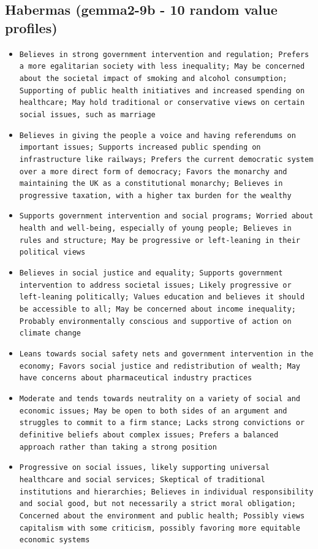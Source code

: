\documentclass[11pt]{article}
\begin{document}
\subsection{Habermas (gemma2-9b - 10 random value profiles)}
\begin{itemize}
\item \texttt{Believes in strong government intervention and regulation; Prefers a more egalitarian society with less inequality; May be concerned about the societal impact of smoking and alcohol consumption; Supporting of public health initiatives and increased spending on healthcare; May hold traditional or conservative views on certain social issues, such as marriage}
\item \texttt{Believes in giving the people a voice and having referendums on important issues; Supports increased public spending on infrastructure like railways; Prefers the current democratic system over a more direct form of democracy; Favors the monarchy and maintaining the UK as a constitutional monarchy; Believes in progressive taxation, with a higher tax burden for the wealthy}
\item \texttt{Supports government intervention and social programs; Worried about health and well-being, especially of young people; Believes in rules and structure; May be progressive or left-leaning in their political views}
\item \texttt{Believes in social justice and equality; Supports government intervention to address societal issues; Likely progressive or left-leaning politically; Values education and believes it should be accessible to all; May be concerned about income inequality; Probably environmentally conscious and supportive of action on climate change}
\item \texttt{Leans towards social safety nets and government intervention in the economy; Favors social justice and redistribution of wealth; May have concerns about pharmaceutical industry practices}
\item \texttt{Moderate and tends towards neutrality on a variety of social and economic issues; May be open to both sides of an argument and struggles to commit to a firm stance; Lacks strong convictions or definitive beliefs about complex issues; Prefers a balanced approach rather than taking a strong position}
\item \texttt{Progressive on social issues, likely supporting universal healthcare and social services; Skeptical of traditional institutions and hierarchies; Believes in individual responsibility and social good, but not necessarily a strict moral obligation; Concerned about the environment and public health; Possibly views capitalism with some criticism, possibly favoring more equitable economic systems}

\end{itemize}
\end{document}
